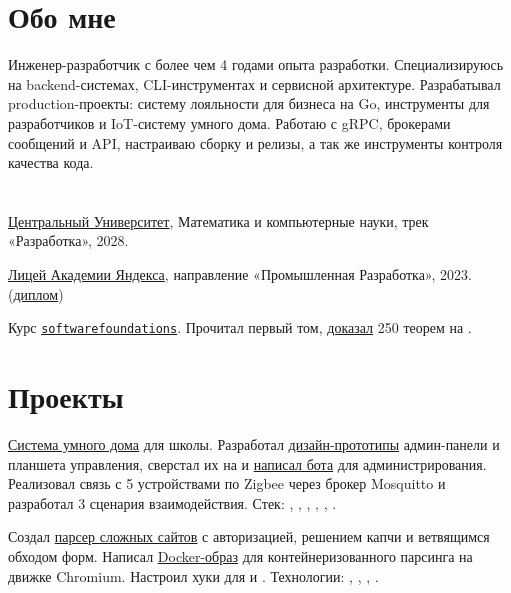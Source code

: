 \documentclass[margin,line]{resume}
\begin{document}
\begin{resume}

  \section{\mysidestyle Обо мне}
  Инженер-разработчик с более чем 4 годами опыта разработки. Специализируюсь на
  backend-системах, CLI-инструментах и сервисной архитектуре. Разрабатывал
  production-проекты: систему лояльности для бизнеса на Go, инструменты для
  разработчиков и IoT-систему умного дома. Работаю с gRPC, брокерами сообщений
  и API, настраиваю сборку и релизы, а так же инструменты контроля
  качества кода.


  \section{}
  \href{https://cu.ru/}{Центральный Университет},
  Математика и компьютерные науки, трек «Разработка», 2028.

  \href{https://lyceum.yandex.ru/}{Лицей
  Академии Яндекса}, направление «Промышленная Разработка», 2023.
  (\href{https://alchemmist.github.io/CV/attachments/yandex-lyceum.pdf}{диплом})

  Курс
  \texttt{\href{https://softwarefoundations.cis.upenn.edu}{softwarefoundations}}.
  Прочитал первый том,
  \href{https://github.com/alchemmist/coq-learning}{доказал} 250
  теорем на .

    \section{\mysidestyle Проекты}\vspace{0.7mm}
  \begin{description}[leftmargin=0pt, itemindent=*, itemsep=8pt]
    \item[SmartCab:] \href{https://github.com/smart-cab}{Система умного дома} для школы.
      Разработал \href{https://www.figma.com/design/8H1tFpxgmIDV1xp06ndi73/SmartCab}{дизайн-прототипы} админ-панели и планшета управления, 
      сверстал их на  и \href{https://github.com/smart-cab/smartcab-bot}{написал бота} для администрирования.
      Реализовал связь с 5 устройствами по Zigbee через брокер Mosquitto и разработал 3 сценария взаимодействия.
      Стек: , , , , , .

    \item[Заказная разработка:] Создал \href{https://github.com/alchemmist/portu-hack}{парсер сложных сайтов}
      с авторизацией, решением капчи и ветвящимся обходом форм.
      Написал \href{https://github.com/alchemmist/portu-hack/blob/develop/parser/Dockerfile}{Docker-образ} для контейнеризованного парсинга  на движке Chromium.
      Настроил  хуки для  и .
      Технологии: , , , .


\end{description}
\end{resume}
\end{document}

